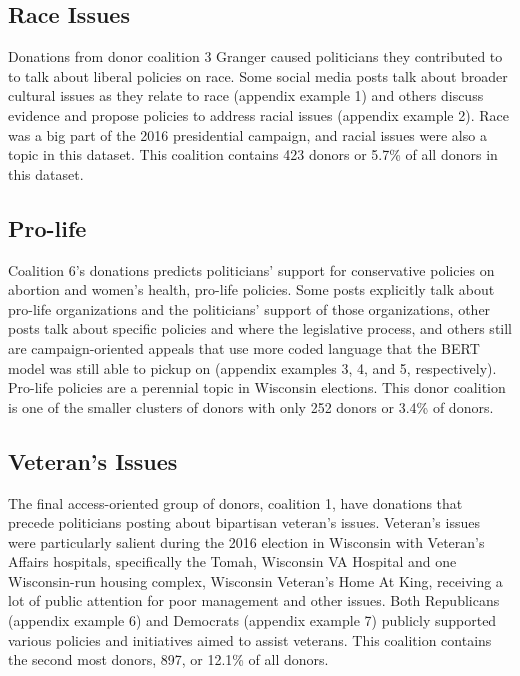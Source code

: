 \documentclass[12pt,]{article}
\begin{document}
\hypertarget{race-issues}{%
\subsection{Race Issues}\label{race-issues}}

Donations from donor coalition 3 Granger caused politicians they
contributed to to talk about liberal policies on race. Some social media
posts talk about broader cultural issues as they relate to race
(appendix example 1) and others discuss evidence and propose policies to
address racial issues (appendix example 2). Race was a big part of the
2016 presidential campaign, and racial issues were also a topic in this
dataset. This coalition contains 423 donors or 5.7\% of all donors in
this dataset.

\hypertarget{pro-life}{%
\subsection{Pro-life}\label{pro-life}}

Coalition 6's donations predicts politicians' support for conservative
policies on abortion and women's health, pro-life policies. Some posts
explicitly talk about pro-life organizations and the politicians'
support of those organizations, other posts talk about specific policies
and where the legislative process, and others still are
campaign-oriented appeals that use more coded language that the BERT
model was still able to pickup on (appendix examples 3, 4, and 5,
respectively). Pro-life policies are a perennial topic in Wisconsin
elections. This donor coalition is one of the smaller clusters of donors
with only 252 donors or 3.4\% of donors.

\hypertarget{veterans-issues}{%
\subsection{Veteran's Issues}\label{veterans-issues}}

The final access-oriented group of donors, coalition 1, have donations
that precede politicians posting about bipartisan veteran's issues.
Veteran's issues were particularly salient during the 2016 election in
Wisconsin with Veteran's Affairs hospitals, specifically the Tomah,
Wisconsin VA Hospital and one Wisconsin-run housing complex, Wisconsin
Veteran's Home At King, receiving a lot of public attention for poor
management and other issues. Both Republicans (appendix example 6) and
Democrats (appendix example 7) publicly supported various policies and
initiatives aimed to assist veterans. This coalition contains the second
most donors, 897, or 12.1\% of all donors.
\end{document}
